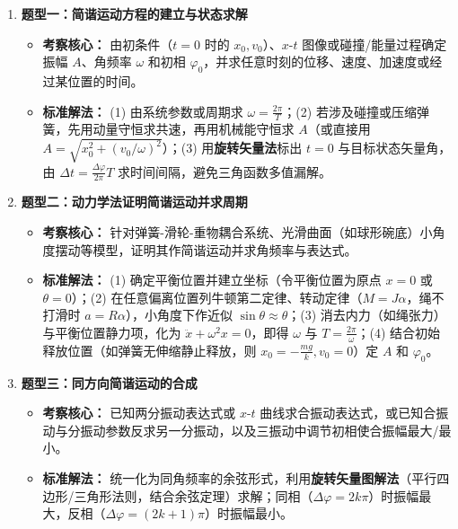 \documentclass[zihao=5,a4paper,UTF8]{ctexart}
\begin{document}
\begin{typebox}[机械振动常见题型分析]
\begin{enumerate}
    \item \textbf{题型一：简谐运动方程的建立与状态求解}
    \begin{itemize}
        \item \textbf{考察核心：} 由初条件（$t=0$ 时的 $x_0, v_0$）、$x\text{-}t$ 图像或碰撞/能量过程确定振幅 $A$、角频率 $\omega$ 和初相 $\varphi_0$，并求任意时刻的位移、速度、加速度或经过某位置的时间。
        \item \textbf{标准解法：} (1) 由系统参数或周期求 $\omega = \frac{2\pi}{T}$；(2) 若涉及碰撞或压缩弹簧，先用动量守恒求共速，再用机械能守恒求 $A$（或直接用 $A = \sqrt{x_0^2 + (v_0/\omega)^2}$）；(3) 用\textbf{旋转矢量法}标出 $t=0$ 与目标状态矢量角，由 $\Delta t = \frac{\Delta\varphi}{2\pi}T$ 求时间间隔，避免三角函数多值漏解。
    \end{itemize}
    \item \textbf{题型二：动力学法证明简谐运动并求周期}
    \begin{itemize}
        \item \textbf{考察核心：} 针对弹簧-滑轮-重物耦合系统、光滑曲面（如球形碗底）小角度摆动等模型，证明其作简谐运动并求角频率与表达式。
        \item \textbf{标准解法：} (1) 确定平衡位置并建立坐标（令平衡位置为原点 $x=0$ 或 $\theta=0$）；(2) 在任意偏离位置列牛顿第二定律、转动定律（$M = J\alpha$，绳不打滑时 $a = R\alpha$），小角度下作近似 $\sin\theta \approx \theta$；(3) 消去内力（如绳张力）与平衡位置静力项，化为 $\ddot{x} + \omega^2 x = 0$，即得 $\omega$ 与 $T = \frac{2\pi}{\omega}$；(4) 结合初始释放位置（如弹簧无伸缩静止释放，则 $x_0 = -\frac{mg}{k}, v_0 = 0$）定 $A$ 和 $\varphi_0$。
    \end{itemize}
    \item \textbf{题型三：同方向简谐运动的合成}
    \begin{itemize}
        \item \textbf{考察核心：} 已知两分振动表达式或 $x\text{-}t$ 曲线求合振动表达式，或已知合振动与分振动参数反求另一分振动，以及三振动中调节初相使合振幅最大/最小。
        \item \textbf{标准解法：} 统一化为同角频率的余弦形式，利用\textbf{旋转矢量图解法}（平行四边形/三角形法则，结合余弦定理）求解；同相（$\Delta\varphi = 2k\pi$）时振幅最大，反相（$\Delta\varphi = (2k+1)\pi$）时振幅最小。
    \end{itemize}
\end{enumerate}
\end{typebox}
\end{document}
